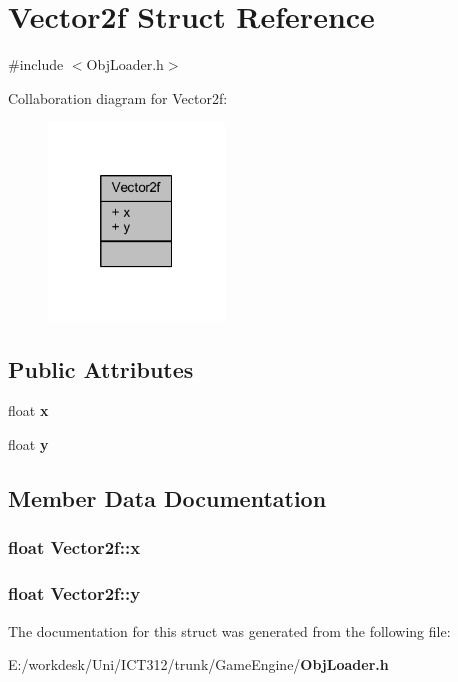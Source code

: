 \section{Vector2f Struct Reference}
\label{struct_vector2f}


{\ttfamily \#include $<$Obj\+Loader.\+h$>$}



Collaboration diagram for Vector2f\+:\nopagebreak
\begin{figure}[H]
\begin{center}
\leavevmode
\includegraphics[width=133pt]{d2/d53/struct_vector2f__coll__graph}
\end{center}
\end{figure}
\subsection*{Public Attributes}
\begin{DoxyCompactItemize}
\item 
float {\bf x}
\item 
float {\bf y}
\end{DoxyCompactItemize}


\subsection{Member Data Documentation}
\subsubsection[{x}]{\setlength{\rightskip}{0pt plus 5cm}float Vector2f\+::x}\label{struct_vector2f_add58d2378e3a3abdb76cf0ac51c9acfc}
\subsubsection[{y}]{\setlength{\rightskip}{0pt plus 5cm}float Vector2f\+::y}\label{struct_vector2f_a14874a72597fd358b15f8ba34b999c4d}


The documentation for this struct was generated from the following file\+:\begin{DoxyCompactItemize}
\item 
E\+:/workdesk/\+Uni/\+I\+C\+T312/trunk/\+Game\+Engine/{\bf Obj\+Loader.\+h}\end{DoxyCompactItemize}
